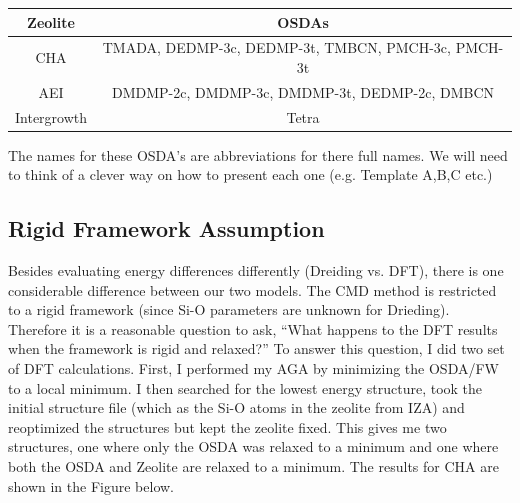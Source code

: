 \documentclass[journal=accacs,manuscript=article, email=true, layout=traditional]{achemso}
\begin{document}
\begin{center}
\begin{tabular}{c|c}
\hline
Zeolite & OSDAs \\
\hline
CHA          & TMADA, DEDMP-3c, DEDMP-3t, TMBCN, PMCH-3c, PMCH-3t \\
AEI          & DMDMP-2c, DMDMP-3c, DMDMP-3t, DEDMP-2c, DMBCN \\
Intergrowth  & Tetra \\
\hline
\end{tabular}
\end{center}

The names for these OSDA's are abbreviations for there full names. We will need to think of a clever way on how to present each one (e.g. Template A,B,C etc.)

\subsection{Rigid Framework Assumption}
\label{sec:org04f7113}
Besides evaluating energy differences differently (Dreiding vs. DFT), there is one considerable difference between our two models. The CMD method is restricted to a rigid framework (since Si-O parameters are unknown for Drieding). Therefore it is a reasonable question to ask, ``What happens to the DFT results when the framework is rigid and relaxed?'' To answer this question, I did two set of DFT calculations. First, I performed my AGA by minimizing the OSDA/FW to a local minimum. I then searched for the lowest energy structure, took the initial structure file (which as the Si-O atoms in the zeolite from IZA) and reoptimized the structures but kept the zeolite fixed. This gives me two structures, one where only the OSDA was relaxed to a minimum and one where both the OSDA and Zeolite are relaxed to a minimum. The results for CHA are shown in the Figure below.
\end{document}
